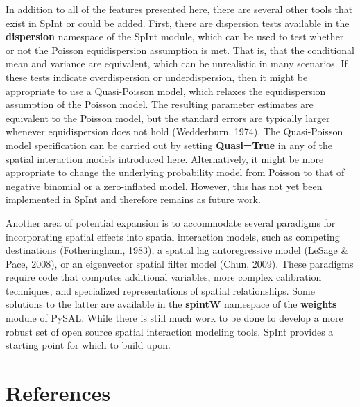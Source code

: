 \documentclass[11pt]{article}
\begin{document}
    In addition to all of the features presented here, there are several
other tools that exist in SpInt or could be added. First, there are
dispersion tests available in the \textbf{dispersion} namespace of the
SpInt module, which can be used to test whether or not the Poisson
equidispersion assumption is met. That is, that the conditional mean
and variance are equivalent, which can be unrealistic in many scenarios.
If these tests indicate overdispersion or underdispersion, then it might
be appropriate to use a Quasi-Poisson model, which relaxes the
equidispersion assumption of the Poisson model. The resulting parameter
estimates are equivalent to the Poisson model, but the standard errors
are typically larger whenever equidispersion does not hold (Wedderburn,
1974). The Quasi-Poisson model specification can be carried out by
setting \textbf{Quasi=True} in any of the spatial interaction models introduced here. Alternatively, it might be more appropriate to change the
underlying probability model from Poisson to that of negative binomial
or a zero-inflated model. However, this has not yet been implemented in
SpInt and therefore remains as future work.

Another area of potential expansion is to accommodate several paradigms for
incorporating spatial effects into spatial interaction models, such as
competing destinations (Fotheringham, 1983), a spatial lag
autoregressive model (LeSage \& Pace, 2008), or an eigenvector spatial
filter model (Chun, 2009). These paradigms require code that computes
additional variables, more complex calibration techniques, and specialized
representations of spatial relationships. Some solutions to the
latter are available in the \textbf{spintW} namespace of the
\textbf{weights} module of PySAL. While there is still much work to be done to
develop a more robust set of open source spatial interaction modeling tools, SpInt provides a starting point for which to build upon.

    \section*{References}\label{references}
\end{document}
